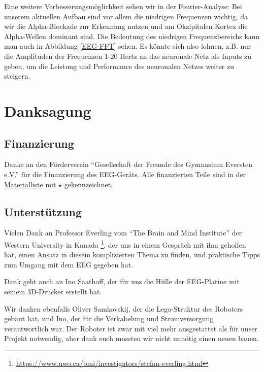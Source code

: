 \documentclass[11pt]{scrartcl}
\begin{document}
	
	Eine weitere Verbesserungsmöglichkeit sehen wir in der Fourier-Analyse:
	Bei unserem aktuellen Aufbau sind vor allem die niedrigen Frequenzen wichtig, da wir die Alpha-Blockade zur Erkennung nutzen und am Okzipitalen Kortex die Alpha-Wellen dominant sind. Die Bedeutung des niedrigen Frequenzbereichs kann man auch in Abbildung \ref{EEG-FFT} sehen. Es könnte sich also lohnen, z.B. nur die Amplituden der Frequenzen 1-20 Hertz an das neuronale Netz als Inputs zu geben, um die Leistung und Performance des neuronalen Netzes weiter zu steigern. 

	\newpage

	\section{Danksagung}

	\subsection{Finanzierung} \label{Foerderverein}

	Danke an den Förderverein \enquote{Gesellschaft der Freunde des Gymnasium Eversten e.V.} für die Finanzierung des EEG-Geräts. Alle finanzierten Teile sind in der \hyperref[Materialien]{Materialliste} mit $\star$ gekennzeichnet. 

	\subsection{Unterstützung} \label{Unterstuetzung}

	Vielen Dank an Professor Everling vom \enquote{The Brain and Mind Institute} der Western University in Kanada \footnote{\url{https://www.uwo.ca/bmi/investigators/stefan-everling.html}}, der uns in einem Gespräch mit ihm geholfen hat, einen Ansatz in diesem komplizierten Thema zu finden, und praktische Tipps zum Umgang mit dem EEG gegeben hat.

	Dank geht auch an Ino Saathoff, der für uns die Hülle der EEG-Platine mit seinem 3D-Drucker erstellt hat.

	Wir danken ebenfalls Oliver Samkovskij, der die Lego-Struktur des Roboters gebaut hat, und Ino, der für die Verkabelung und Stromversorgung verantwortlich war. Der Roboter ist zwar mit viel mehr ausgestattet als für unser Projekt notwendig, aber dank euch mussten wir nicht unnötig einen neuen bauen.
\end{document}
